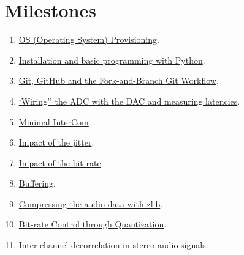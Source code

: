 \section{Milestones}
\begin{enumerate}
\item \href{https://tecnologias-multimedia.github.io/study_guide/provisioning/}{OS (Operating System) Provisioning}.
\item \href{https://tecnologias-multimedia.github.io/study_guide/install/}{Installation and basic programming with Python}.
\item \href{https://tecnologias-multimedia.github.io/study_guide/git/}{Git, GitHub and the Fork-and-Branch Git Workflow}.
\item \href{https://tecnologias-multimedia.github.io/study_guide/wiring/}{`Wiring'' the ADC with the DAC and measuring latencies}.
\item \href{https://tecnologias-multimedia.github.io/study_guide/minimal/}{Minimal InterCom}.
\item \href{https://tecnologias-multimedia.github.io/study_guide/jitter_impact/}{Impact of the jitter}.
\item \href{https://tecnologias-multimedia.github.io/study_guide/bit-rate_impact/}{Impact of the bit-rate}.
\item \href{https://tecnologias-multimedia.github.io/study_guide/buffering/}{Buffering}.
\item \href{https://tecnologias-multimedia.github.io/study_guide/compress/}{Compressing the audio data with zlib}.
\item \href{https://tecnologias-multimedia.github.io/study_guide/quantization/}{Bit-rate Control through Quantization}.
\item \href{https://tecnologias-multimedia.github.io/study_guide/stereo_coding/}{Inter-channel decorrelation in stereo audio signals}.
\end{enumerate}

